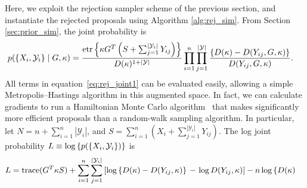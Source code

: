 Here, we exploit the rejection sampler scheme of the previous section, %
and instantiate the rejected proposals using Algorithm \ref{alg:rej_sim}. 
From Section \ref{sec:prior_sim}, the joint probability is %
\begin{align}
  p(\{X_i, \cY_i\}\mid G,\bkappa)    %
         &= \frac{ \etr\left\{\bkappa G^T\left(S+\sum_{j=1}^{|\cY_i|}  Y_{ij}\right ) \right\} }{D(\bkappa)^{1+|\cY|}}
             \prod_{i=1}^n   \prod_{j=1}^{|\cY|} \frac{ \left\{D(\bkappa) -  D(Y_{ij}, G, \bkappa)\right\}}{D(Y_{ij}, G, \bkappa)}.  \label{eq:rej_joint1}
\end{align}
All terms in equation~\eqref{eq:rej_joint1} can be evaluated easily, allowing %
a simple Metropolis--Hastings algorithm in this augmented space.
%
In fact, we can calculate gradients to run a Hamiltonian Monte Carlo algorithm~\citep{Neal2010} 
that makes significantly more efficient proposals than a random-walk sampling algorithm. %
In particular,
let $N = n + \sum_{i=1}^n |\mathcal{Y}_i|$, and
$S = \sum_{i=1}^n(X_i + \sum_{j=1}^{|\mathcal{Y}_i|} Y_{ij})$. The log joint probability $L \equiv \log\left\{p(\{X_i,\mathcal{Y}_i\})\right\}$ is
\begin{align}
 L &= \text{trace}(G^T \bkappa S) +\sum_{i=1}^n \sum_{j=1}^{|\cY_i|}\left[ \log \left\{D(\bkappa) - D(Y_{ij}, \bkappa) \right\}\right. 
                        - \left. \log D(Y_{ij}, \bkappa)\right] - n \log\left\{D(\bkappa)\right. \nonumber
\end{align}
